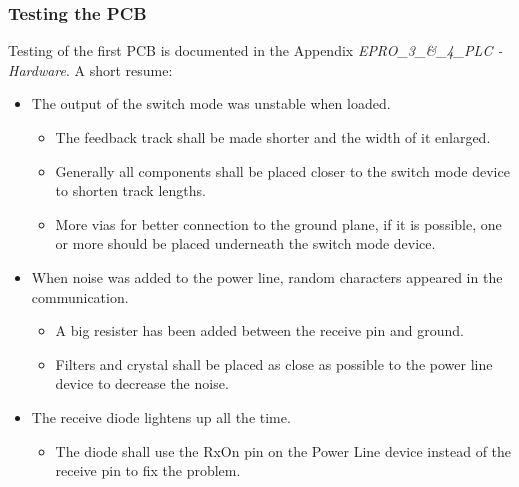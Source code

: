 \subsubsection{Testing the PCB}
Testing of the first PCB is documented in the Appendix \textit{EPRO\_3\_\&\_4\_PLC - Hardware}. A short resume:
\begin{itemize}
	\item The output of the switch mode was unstable when loaded. 
	\begin{itemize}
		\item The feedback track shall be made shorter and the width of it enlarged. 
		\item Generally all components shall be placed closer to the switch mode device to shorten track lengths. 
		\item More vias for better connection to the ground plane, if it is possible, one or more should be placed underneath the switch mode device.
	\end{itemize}
	\item When noise was added to the power line, random characters appeared in the communication.
	\begin{itemize}
		\item A big resister has been added between the receive pin and ground.
		\item Filters and crystal shall be placed as close as possible to the power line device to decrease the noise.
	\end{itemize} 
	\item The receive diode lightens up all the time.
	\begin{itemize}
		\item The diode shall use the RxOn pin on the Power Line device instead of the receive pin to fix the problem.
	\end{itemize}
\end{itemize}

